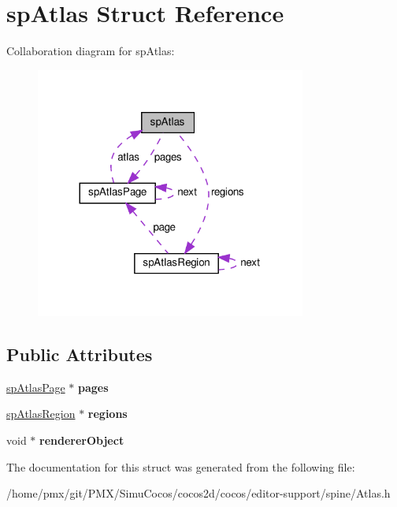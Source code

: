 \hypertarget{structspAtlas}{}\section{sp\+Atlas Struct Reference}
\label{structspAtlas}


Collaboration diagram for sp\+Atlas\+:
\nopagebreak
\begin{figure}[H]
\begin{center}
\leavevmode
\includegraphics[width=252pt]{structspAtlas__coll__graph}
\end{center}
\end{figure}
\subsection*{Public Attributes}
\begin{DoxyCompactItemize}
\item 
\mbox{\label{structspAtlas_a65488e8d65df9c95ac80c6c6560929ce}} 
\hyperlink{structspAtlasPage}{sp\+Atlas\+Page} $\ast$ {\bfseries pages}
\item 
\mbox{\label{structspAtlas_a728a0a8eb09832a218b712f6d48ff77c}} 
\hyperlink{structspAtlasRegion}{sp\+Atlas\+Region} $\ast$ {\bfseries regions}
\item 
\mbox{\label{structspAtlas_a679aa420d8903e7f8fab1dbf0f4d1a33}} 
void $\ast$ {\bfseries renderer\+Object}
\end{DoxyCompactItemize}


The documentation for this struct was generated from the following file\+:\begin{DoxyCompactItemize}
\item 
/home/pmx/git/\+P\+M\+X/\+Simu\+Cocos/cocos2d/cocos/editor-\/support/spine/Atlas.\+h\end{DoxyCompactItemize}
